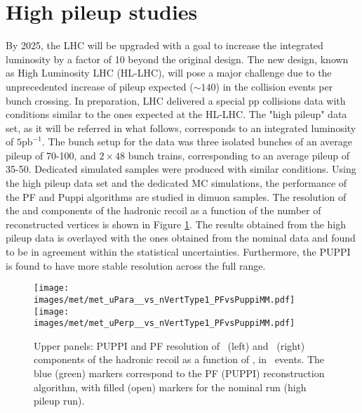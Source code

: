 \section{High pileup studies}
\noindent\justify
By 2025, the LHC will be upgraded with a goal to increase the integrated luminosity by a factor of 10 beyond the original design. 
The new design, known as High Luminosity LHC (HL-LHC), will pose a major challenge due to the unprecedented increase of pileup expected ($\sim140$) in the collision events per bunch crossing. 
In preparation, LHC delivered a special pp collisions data with conditions similar to the ones expected at the HL-LHC. 
The "high pileup" data set, as it will be referred in what follows, corresponds to an integrated luminosity of $5\mathrm{pb}^{-1}$. 
The bunch setup for the data was three isolated bunches of an average pileup of 70-100, and $2\times48$ bunch trains, corresponding to an average pileup of 35-50. 
Dedicated simulated samples were produced with similar conditions. 
\newpara
\noindent\justify
Using the high pileup data set and the dedicated MC simulations, the performance of the PF \ptmiss and Puppi \ptmiss algorithms are studied in dimuon samples.
The \ptmiss resolution of the \upar and \uperp components of the hadronic recoil as a function of the number of reconstructed
vertices is shown in Figure \ref{fig:Res_vs_PileUpVeryHighPU}. 
The results obtained from the high pileup data is overlayed with the ones obtained from the nominal data and found to be in agreement within the statistical uncertainties. 
Furthermore, the PUPPI \ptmiss is found to have more stable resolution across the full range.
\begin{figure}[!htp]
  \centering
   \texttt{[image: images/met/met\_uPara\_\_vs\_nVertType1\_PFvsPuppiMM.pdf]}
   \texttt{[image: images/met/met\_uPerp\_\_vs\_nVertType1\_PFvsPuppiMM.pdf]}
   \caption{Upper panels: PUPPI and PF \ptmiss resolution of \upar\ (left) and \uperp\ (right) components of the hadronic recoil as a function of \nvtx, in \Zmm\ events. 
The blue (green) markers correspond to the PF (PUPPI) \ptmiss reconstruction algorithm, with filled (open) markers for the nominal run (high pileup run). } 
   \label{fig:Res_vs_PileUpVeryHighPU}
\end{figure}                                                                                                                                                                         
